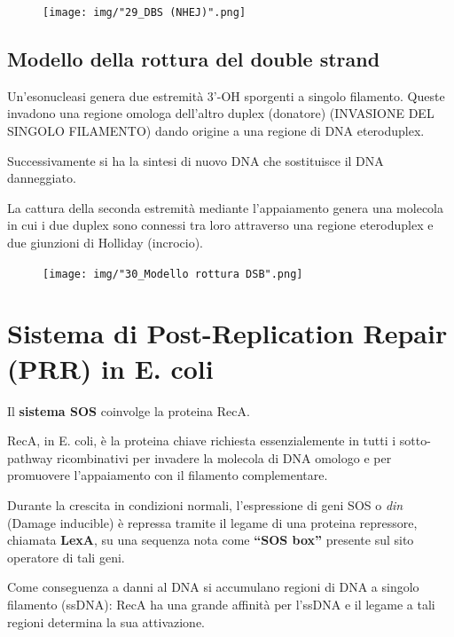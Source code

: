 \documentclass[11pt]{book}
\begin{document}
\clearpage
\begin{figure}[htp]
\centering
\texttt{[image: img/"29\_DBS (NHEJ)".png]}
\caption{}
\label{}
\end{figure}


\subsection{Modello della rottura del double
strand}\label{modello-della-rottura-del-double-strand}

Un'esonucleasi genera due estremità 3'-OH sporgenti a singolo filamento.
Queste invadono una regione omologa dell'altro duplex (donatore)
(INVASIONE DEL SINGOLO FILAMENTO) dando origine a una regione di DNA
eteroduplex.

Successivamente si ha la sintesi di nuovo DNA che sostituisce il DNA
danneggiato.

La cattura della seconda estremità mediante l'appaiamento genera una
molecola in cui i due duplex sono connessi tra loro attraverso una
regione eteroduplex e due giunzioni di Holliday (incrocio).

\begin{figure}[htp]
\centering
\texttt{[image: img/"30\_Modello rottura DSB".png]}
\caption{}
\label{modello-rottura-dsb}
\end{figure}

\clearpage
\section{Sistema di Post-Replication Repair (PRR) in E.
coli}\label{sistema-di-post-replication-repair-prr-in-e.-coli}

Il \textbf{sistema SOS} coinvolge la proteina RecA.

RecA, in E. coli, è la proteina chiave richiesta essenzialemente in
tutti i sotto-pathway ricombinativi per invadere la molecola di DNA
omologo e per promuovere l'appaiamento con il filamento complementare.

Durante la crescita in condizioni normali, l'espressione di geni SOS o
\emph{din} (Damage inducible) è repressa tramite il legame di una
proteina repressore, chiamata \textbf{LexA}, su una sequenza nota come
\textbf{``SOS box''} presente sul sito operatore di tali geni.

Come conseguenza a danni al DNA si accumulano regioni di DNA a singolo
filamento (ssDNA): RecA ha una grande affinità per l'ssDNA e il legame a
tali regioni determina la sua attivazione.
\end{document}
